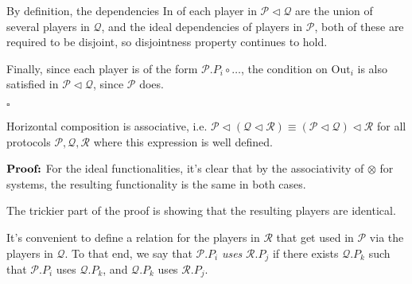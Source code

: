 \begin{definition}
By definition, the dependencies $\text{In}$ of each player in $\mathcal{P} \lhd \mathcal{Q}$
are the union of several players in $\mathcal{Q}$, and
the ideal dependencies of players in $\mathcal{P}$,
both of these are required to be disjoint, so disjointness property
continues to hold.

Finally, since each player is of the form $\mathcal{P}.P_i \circ \ldots$,
the condition on $\text{Out}_i$ is also satisfied in $\mathcal{P} \lhd \mathcal{Q}$,
since $\mathcal{P}$ does.

$\square$

\end{definition}

\begin{lemma}
Horizontal composition is associative, i.e.
${\mathcal{P} \lhd (\mathcal{Q} \lhd \mathcal{R}) \equiv (\mathcal{P} \lhd \mathcal{Q}) \lhd \mathcal{R}}$
for all protocols $\mathcal{P}, \mathcal{Q}, \mathcal{R}$ where this expression is well defined.

$\textbf{Proof:}$
For the ideal functionalities, it's clear that by the associativity
of $\otimes$ for systems, the resulting functionality is the same
in both cases.

The trickier part of the proof is showing that the resulting players
are identical.

It's convenient to define a relation for the players in $\mathcal{R}$
that get used in $\mathcal{P}$ via the players in $\mathcal{Q}$.
To that end, we say that $\mathcal{P}.P_i$ \emph{uses} $\mathcal{R}.P_j$
if there exists $\mathcal{Q}.P_k$ such that $\mathcal{P}.P_i$ uses
$\mathcal{Q}.P_k$, and $\mathcal{Q}.P_k$ uses $\mathcal{R}.P_j$.


\end{lemma}
